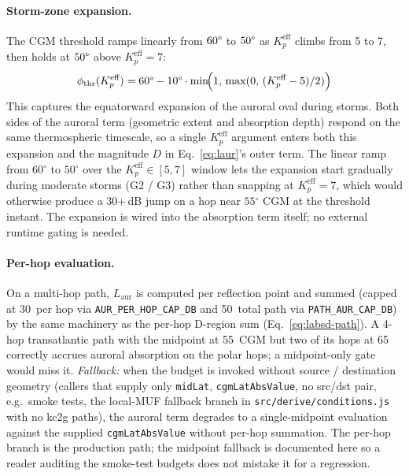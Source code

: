 \documentclass[11pt,a4paper]{article}
\newcommand{\SI}[2]{#1\,\text{#2}}
\newcommand{\dB}{\text{dB}}
\newcommand{\degree}{\ensuremath{{}^\circ}}
\begin{document}
\paragraph{Storm-zone expansion.} The CGM threshold ramps linearly
from $60\text{\textdegree}$ to $50\text{\textdegree}$ as
$K_p^{\text{eff}}$ climbs from 5 to 7, then holds at
$50\text{\textdegree}$ above $K_p^{\text{eff}} = 7$:
\begin{equation}\label{eq:auroralexpansion}
  \phi_{\text{thr}}(K_p^{\text{eff}}) = 60\text{\textdegree} -
    10\text{\textdegree} \cdot \min\!\Bigl(1,\,\max(0,\,(K_p^{\text{eff}} - 5)/2)\Bigr)
\end{equation}
This captures the equatorward expansion of the auroral oval during
storms.  Both sides of the auroral term (geometric extent and
absorption depth) respond on the same thermospheric timescale, so
a single $K_p^{\text{eff}}$ argument enters both this expansion
and the magnitude $D$ in Eq.~\ref{eq:laur}'s outer term.  The
linear ramp from $60\degree$ to $50\degree$ over the
$K_p^{\text{eff}} \in [5, 7]$ window lets the expansion start
gradually during moderate storms (G2 / G3) rather than snapping
at $K_p^{\text{eff}} = 7$, which would otherwise produce a
30+\,dB jump on a hop near $55\degree$ CGM at the threshold
instant.  The expansion is wired into the absorption term itself;
no external runtime gating is needed.

\paragraph{Per-hop evaluation.} On a multi-hop path,
$L_{\text{aur}}$ is computed per reflection point and summed
(capped at \SI{30}{\dB} per hop via
\texttt{AUR\_PER\_HOP\_CAP\_DB} and \SI{50}{\dB} total path
via \texttt{PATH\_AUR\_CAP\_DB}) by the same machinery as the
per-hop D-region sum (Eq.~\ref{eq:labsd-path}). A 4-hop
transatlantic path with the midpoint at \SI{55}{\textdegree}
CGM but two of its hops at \SI{65}{\textdegree} correctly
accrues auroral absorption on the polar hops; a midpoint-only
gate would miss it.  \emph{Fallback:} when the budget
is invoked without source / destination geometry (callers that
supply only \texttt{midLat}, \texttt{cgmLatAbsValue}, no
src/dst pair, e.g.\ smoke tests, the local-MUF fallback
branch in \texttt{src/derive/conditions.js} with no kc2g
paths), the auroral term degrades to a single-midpoint
evaluation against the supplied \texttt{cgmLatAbsValue}
without per-hop summation.  The per-hop branch is the
production path; the midpoint fallback is documented here so
a reader auditing the smoke-test budgets does not mistake
it for a regression.
\end{document}
